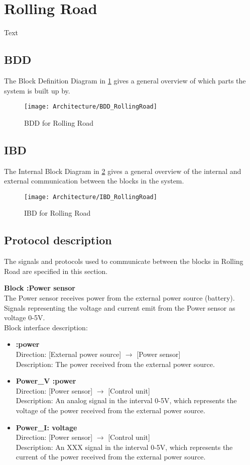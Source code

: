\section{Rolling Road}
Text

\subsection{BDD}
The Block Definition Diagram in \ref{fig:RR_BDD} gives a general overview of which parts the system is built up by.

\begin{figure}[H]
	\centering
	\texttt{[image: Architecture/BDD\_RollingRoad]}
	\caption{BDD for Rolling Road}
	\label{fig:RR_BDD}
\end{figure}

\subsection{IBD}
The Internal Block Diagram in \ref{fig:RR_IBD} gives a general overview of the internal and external communication between the blocks in the system.

\begin{figure}[H]
	\centering
	\texttt{[image: Architecture/IBD\_RollingRoad]}
	\caption{IBD for Rolling Road}
	\label{fig:RR_IBD}
\end{figure}

\subsection{Protocol description}
The signals and protocols used to communicate between the blocks in Rolling Road are specified in this section.

\textbf{Block :Power sensor}\\
The Power sensor receives power from the external power source (battery). Signals representing the voltage and current emit from the Power sensor as voltage 0-5V.\\
Block interface description:

\begin{itemize}
	\item \textbf{:power}\\
		Direction: [External power source] $\rightarrow$ [Power sensor]\\
		Description: The power received from the external power source.
	\item \textbf{Power\_V :power}\\
		Direction: [Power sensor] $\rightarrow$ [Control unit]\\
		Description: An analog signal in the interval 0-5V, which represents the voltage of the power received from the external power source.
	\item \textbf{Power\_I: voltage}\\
		Direction: [Power sensor] $\rightarrow$ [Control unit]\\
		Description: An XXX signal in the interval 0-5V, which represents the current of the power received from the external power source.
\end{itemize}

